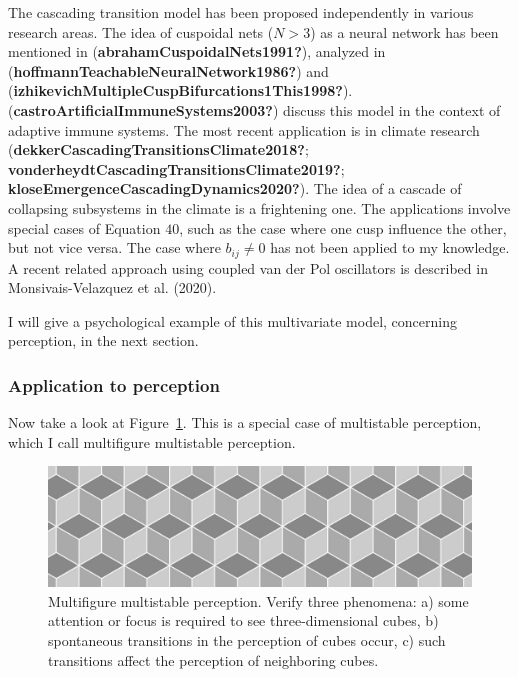 \documentclass[
  letterpaper,
]{scrbook}
\begin{document}
The cascading transition model has been proposed independently in
various research areas. The idea of cuspoidal nets (\(N>3\)) as a neural
network has been mentioned in (\textbf{abrahamCuspoidalNets1991?}),
analyzed in (\textbf{hoffmannTeachableNeuralNetwork1986?}) and
(\textbf{izhikevichMultipleCuspBifurcations1This1998?}).
(\textbf{castroArtificialImmuneSystems2003?}) discuss this model in the
context of adaptive immune systems. The most recent application is in
climate research (\textbf{dekkerCascadingTransitionsClimate2018?};
\textbf{vonderheydtCascadingTransitionsClimate2019?};
\textbf{kloseEmergenceCascadingDynamics2020?}). The idea of a cascade of
collapsing subsystems in the climate is a frightening one. The
applications involve special cases of Equation \(40\), such as the case
where one cusp influence the other, but not vice versa. The case where
\(b_{ij} \neq 0\) has not been applied to my knowledge. A recent related
approach using coupled van der Pol oscillators is described in
Monsivais-Velazquez et al. (2020).

I will give a psychological example of this multivariate model,
concerning perception, in the next section.

\hypertarget{application-to-perception}{%
\subsubsection{Application to
perception}\label{application-to-perception}}

Now take a look at Figure~\ref{fig-ch5-img18-old-66}. This is a special
case of multistable perception, which I call multifigure multistable
perception.

\begin{figure}

{\centering \includegraphics[width=6.26389in,height=\textheight]{media/ch5/image18.jpg}

}

\caption{\label{fig-ch5-img18-old-66}Multifigure multistable perception.
Verify three phenomena: a) some attention or focus is required to see
three-dimensional cubes, b) spontaneous transitions in the perception of
cubes occur, c) such transitions affect the perception of neighboring
cubes.}

\end{figure}
\end{document}
